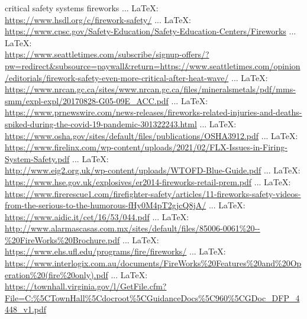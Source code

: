 \begin{thebibliography}{99}
{{{{{{{	
	critical safety systems fireworks
	 ... \LaTeX:\\ \url{https://www.hsdl.org/c/firework-safety/}
	 ... \LaTeX:\\ \url{https://www.cpsc.gov/Safety-Education/Safety-Education-Centers/Fireworks}
	 ... \LaTeX:\\ \url{https://www.seattletimes.com/subscribe/signup-offers/?pw=redirect&subsource=paywall&return=https://www.seattletimes.com/opinion/editorials/firework-safety-even-more-critical-after-heat-wave/}
	 ... \LaTeX:\\ \url{https://www.nrcan.gc.ca/sites/www.nrcan.gc.ca/files/mineralsmetals/pdf/mms-smm/expl-expl/20170828-G05-09E_ACC.pdf}
	 ... \LaTeX:\\ \url{https://www.prnewswire.com/news-releases/fireworks-related-injuries-and-deaths-spiked-during-the-covid-19-pandemic-301322243.html}
	 ... \LaTeX:\\ \url{https://www.osha.gov/sites/default/files/publications/OSHA3912.pdf}
	 ... \LaTeX:\\ \url{https://www.firelinx.com/wp-content/uploads/2021/02/FLX-Issues-in-Firing-System-Safety.pdf}
	 ... \LaTeX:\\ \url{http://www.eig2.org.uk/wp-content/uploads/WTOFD-Blue-Guide.pdf}
	 ... \LaTeX:\\ \url{https://www.hse.gov.uk/explosives/er2014-fireworks-retail-prem.pdf}
	 ... \LaTeX:\\ \url{https://www.firerescue1.com/firefighter-safety/articles/11-fireworks-safety-videos-from-the-serious-to-the-humorous-fHy0M4pT2gjcQ8jA/}
	 ... \LaTeX:\\ \url{https://www.aidic.it/cet/16/53/044.pdf}
	 ... \LaTeX:\\ \url{http://www.alarmascasas.com.mx/sites/default/files/85006-0061%20--%20FireWorks%20Brochure.pdf}
	 ... \LaTeX:\\ \url{https://www.ehs.ufl.edu/programs/fire/fireworks/}
	 ... \LaTeX:\\ \url{https://www.interlogix.com.au/documents/FireWorks%20Features%20and%20Operation%20(fire%20only).pdf}
	 ... \LaTeX:\\ \url{https://townhall.virginia.gov/l/GetFile.cfm?File=C:%5CTownHall%5Cdocroot%5CGuidanceDocs%5C960%5CGDoc_DFP_4448_v1.pdf}
}}}}}}}
\end{thebibliography}
